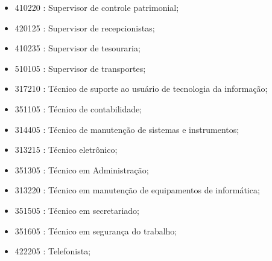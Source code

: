 \begin{itemize}
\begin{itemize}
\begin{itemize}
      \item 410220 : Supervisor de controle patrimonial;
      \item 420125 : Supervisor de recepcionistas;
      \item 410235 : Supervisor de tesouraria;
      \item 510105 : Supervisor de transportes;
      \item 317210 : Técnico de suporte ao usuário de tecnologia da informação;
      \item 351105 : Técnico de contabilidade;
      \item 314405 : Técnico de manutenção de sistemas e instrumentos;
      \item 313215 : Técnico eletrônico;
      \item 351305 : Técnico em Administração;
      \item 313220 : Técnico em manutenção de equipamentos de informática;
      \item 351505 : Técnico em secretariado;
      \item 351605 : Técnico em segurança do trabalho;
      \item 422205 : Telefonista;
    \end{itemize}
  \end{itemize}
\end{itemize}
